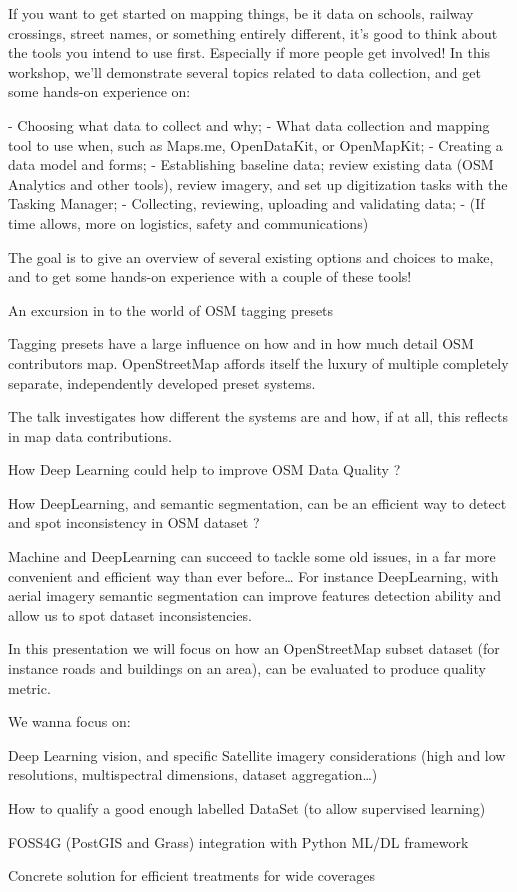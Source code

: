 {%
  If you want to get started on mapping things, be it data on schools, railway crossings, street
  names, or something entirely different, it's good to think about the tools you intend to use
  first. Especially if more people get involved! In this workshop, we'll demonstrate several topics
  related to data collection, and get some hands-on experience on:

  - Choosing what data to collect and why;
  - What data collection and mapping tool to use when, such as Maps.me, OpenDataKit, or OpenMapKit;
  - Creating a data model and forms;
  - Establishing baseline data; review existing data (OSM Analytics and other tools), review imagery, and set up digitization tasks with the Tasking Manager;
  - Collecting, reviewing, uploading and validating data;
  - (If time allows, more on logistics, safety and communications)

  The goal is to give an overview of several existing options and choices to make, and to get some
  hands-on experience with a couple of these tools!%
}

%
{An excursion in to the world of OSM tagging presets}%
{}%
{%
  Tagging presets have a large influence on how and in how much detail OSM contributors map.
  OpenStreetMap affords itself the luxury of multiple completely separate, independently developed
  preset systems.

  The talk investigates how different the systems are and how, if at all, this reflects in map data
  contributions.%
}
%
{How Deep Learning could help to improve OSM Data Quality ?}%
{}%
{%
  How DeepLearning, and semantic segmentation, can be an efficient way to detect and spot
  inconsistency in OSM dataset ? 

  Machine and DeepLearning can succeed to tackle some old issues, in a far more convenient and
  efficient way than ever before… For instance DeepLearning, with aerial imagery semantic
  segmentation can improve features detection ability and allow us to spot dataset inconsistencies.
  
  In this presentation we will focus on how an OpenStreetMap subset dataset (for instance roads and
  buildings on an area), can be evaluated to produce quality metric.
  
  We wanna focus on:
  
  Deep Learning vision, and specific Satellite imagery considerations (high and low resolutions,
  multispectral dimensions, dataset aggregation…)
  
  How to qualify a good enough labelled DataSet (to allow supervised learning)
  
  FOSS4G (PostGIS and Grass) integration with Python ML/DL framework
  
  Concrete solution for efficient treatments for wide coverages%
}

